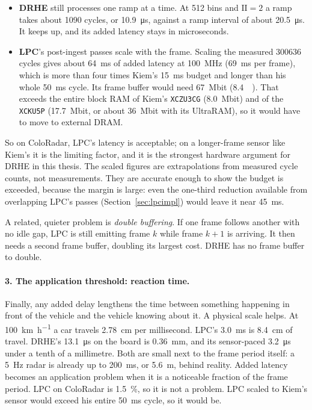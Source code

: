 \begin{itemize}
\item \textbf{DRHE} still processes one ramp at a time. At 512 bins and
$\mathrm{II} = 2$ a ramp takes about \num{1090} cycles, or
\SI{10.9}{\micro\second}, against a ramp interval of about
\SI{20.5}{\micro\second}. It keeps up, and its added latency stays in
microseconds.
\item \textbf{LPC}'s post-ingest passes scale with the frame. Scaling the
measured \num{300636} cycles gives about \SI{64}{\milli\second} of added
latency at \SI{100}{\mega\hertz} (\SI{69}{\milli\second} per frame), which is
more than four times Kiem's \SI{15}{\milli\second} budget and longer than his
whole \SI{50}{\milli\second} cycle. Its frame buffer would need
\SI{67}{\mega bit} (\SI{8.4}{\mega\byte}). That exceeds the entire block RAM of
Kiem's \texttt{XCZU3CG} (\SI{8.0}{\mega bit}) and of the \texttt{XCKU5P}
(\SI{17.7}{\mega bit}, or about \SI{36}{\mega bit} with its UltraRAM), so it
would have to move to external DRAM.
\end{itemize}

\noindent
So on ColoRadar, LPC's latency is acceptable; on a longer-frame sensor like
Kiem's it is the limiting factor, and it is the strongest hardware argument for
DRHE in this thesis. The scaled figures are extrapolations from measured cycle
counts, not measurements. They are accurate enough to show the budget is
exceeded, because the margin is large: even the one-third reduction available
from overlapping LPC's passes (Section~\ref{sec:lpcimpl}) would leave it near
\SI{45}{\milli\second}.

A related, quieter problem is \emph{double buffering}. If one frame follows
another with no idle gap, LPC is still emitting frame $k$ while frame $k+1$ is
arriving. It then needs a second frame buffer, doubling its largest cost.
DRHE has no frame buffer to double.

\paragraph{3. The application threshold: reaction time.} Finally, any added
delay lengthens the time between something happening in front of the vehicle
and the vehicle knowing about it. A physical scale helps. At
\SI{100}{\kilo\metre\per\hour} a car travels \SI{2.78}{\centi\metre} per
millisecond. LPC's \SI{3.0}{\milli\second} is \SI{8.4}{\centi\metre} of
travel. DRHE's \SI{13.1}{\micro\second} on the board is \SI{0.36}{\milli\metre},
and its sensor-paced \SI{3.2}{\micro\second} under a tenth of a millimetre. Both
are small next to the frame period itself: a \SI{5}{\hertz} radar is already up
to \SI{200}{\milli\second}, or \SI{5.6}{\metre}, behind reality. Added latency
becomes an application problem when it is a noticeable fraction of the frame
period. LPC on ColoRadar is \SI{1.5}{\percent}, so it is not a problem. LPC
scaled to Kiem's sensor would exceed his entire \SI{50}{\milli\second} cycle, so
it would be.

